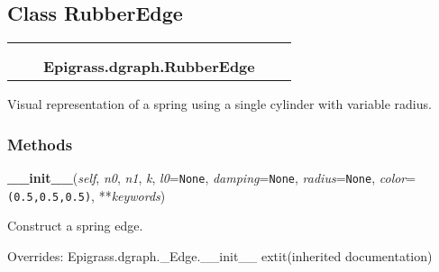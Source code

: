 \subsection{Class RubberEdge}

    \label{Epigrass:dgraph:RubberEdge}
\begin{tabular}{cccccc}
\multicolumn{2}{r}{\settowidth{\BCL}{Epigrass.dgraph.\_Edge}\multirow{2}{\BCL}{Epigrass.dgraph.\_Edge}}
&&
  \\\cline{3-3}
  &&\multicolumn{1}{c|}{}
&&
  \\
&&\multicolumn{2}{l}{\textbf{Epigrass.dgraph.RubberEdge}}
\end{tabular}

Visual representation of a spring using a single cylinder with variable 
radius.



  \subsubsection{Methods}

    \vspace{0.5ex}

    \begin{boxedminipage}{\textwidth}

    \raggedright \textbf{\_\_init\_\_}(\textit{self}, \textit{n0}, \textit{n1}, \textit{k}, \textit{l0}=\texttt{None}, \textit{damping}=\texttt{None}, \textit{radius}=\texttt{None}, \textit{color}=\texttt{(0.5,0.5,0.5)}, **\textit{keywords})

    Construct a spring edge.

    \vspace{1ex}

      Overrides: Epigrass.dgraph.\_Edge.\_\_init\_\_ 	extit{(inherited documentation)}

    \end{boxedminipage}

    \label{Epigrass:dgraph:RubberEdge:update}

    \vspace{0.5ex}

